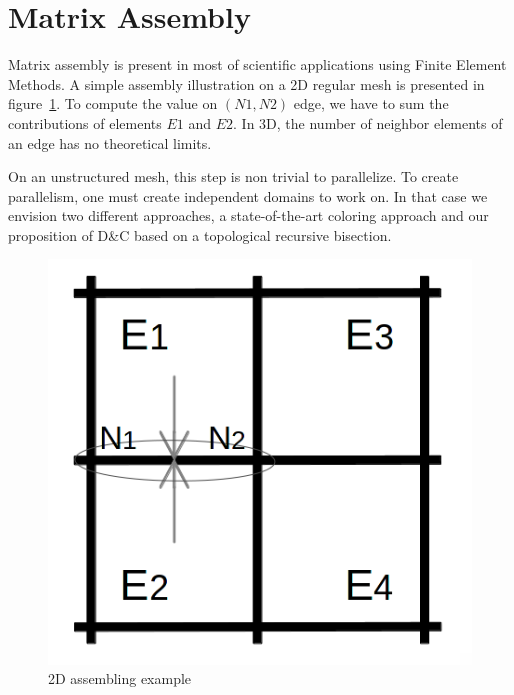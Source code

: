 \documentclass{IOS-Book-Article}
\begin{document}
\section{Matrix Assembly}

Matrix assembly is present in most of scientific applications using Finite Element Methods.
A simple assembly illustration on a 2D regular mesh is presented in figure~\ref{fig:2Dasm}.
To compute the value on $(N1,N2)$ edge, we have to sum the contributions of elements $E1$ and $E2$.
In 3D, the number of neighbor elements of an edge has no theoretical limits.

On an unstructured mesh, this step is non trivial to parallelize.
To create parallelism, one must create independent domains to work on.
In that case we envision two different approaches, a state-of-the-art coloring approach and our proposition of D\&C based on a topological recursive bisection.
\begin{figure}[htp]
 \centering
 \includegraphics[scale=0.2]{2D_asm.png}
 \caption{2D assembling example}
 \label{fig:2Dasm}
\end{figure}
\end{document}
